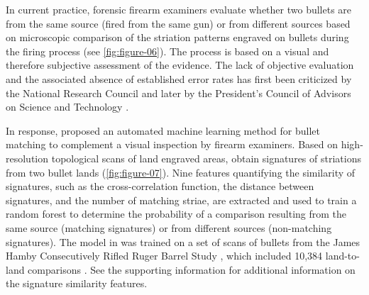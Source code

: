 \documentclass[AMS,STIX2COL]{WileyNJD-v2}\usepackage[]{graphicx}\usepackage[]{color}
\begin{document}
In current practice, forensic firearm examiners evaluate whether two bullets are from the same source (fired from the same gun) or from different sources based on microscopic comparison of the striation patterns engraved on bullets during the firing process (see \autoref{fig:figure-06}). The process is based on a visual and therefore subjective assessment of the evidence. The lack of objective evaluation and the associated absence of established error rates has first been criticized by the National Research Council \cite{nrc:2009} and later by the President's Council of Advisors on Science and Technology \cite{pcast:2016}.

In response, \citet{hare:2017} proposed an automated machine learning method for bullet matching to complement a visual inspection by firearm examiners. Based on high-resolution topological scans of land engraved areas, \citet{hare:2017} obtain signatures of striations from two bullet lands (\autoref{fig:figure-07}). Nine features quantifying the similarity of signatures, such as the cross-correlation function, the distance between signatures, and the number of matching striae, are extracted and used to train a random forest to determine the probability of a comparison resulting from the same source (matching signatures) or from different sources (non-matching signatures). The model in \citet{hare:2017} was trained on a set of scans of bullets from the James Hamby Consecutively Rifled Ruger Barrel Study \citep{hamby:2009}, which included 10,384 land-to-land comparisons \citep{hare:2017}. See the supporting information for additional information on the signature similarity features.
\end{document}
